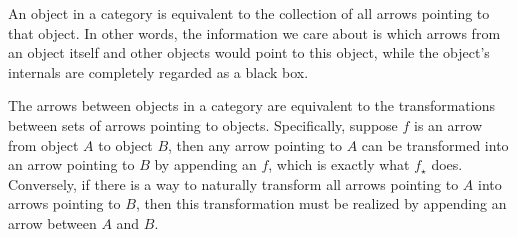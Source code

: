 \documentclass{report}
\begin{document}
An object in a category is equivalent to the collection of all arrows pointing to that object. In other words, the information we care about is which arrows from an object itself and other objects would point to this object, while the object's internals are completely regarded as a black box. 

The arrows between objects in a category are equivalent to the transformations between sets of arrows pointing to objects. Specifically, suppose $f$ is an arrow from object $A$ to object $B$, then any arrow pointing to $A$ can be transformed into an arrow pointing to $B$ by appending an $f$, which is exactly what $f_\star$ does. Conversely, if there is a way to naturally transform all arrows pointing to $A$ into arrows pointing to $B$, then this transformation must be realized by appending an arrow between $A$ and $B$.
\end{document}
